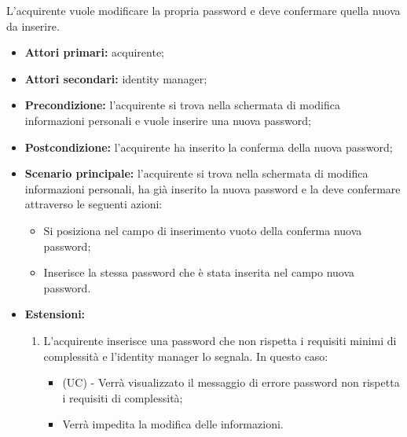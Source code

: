 L'acquirente vuole modificare la propria password e deve confermare quella nuova da inserire.
\begin{itemize}
    \item \textbf{Attori primari:} acquirente;
    \item \textbf{Attori secondari:} identity manager;
    \item \textbf{Precondizione:} l'acquirente si trova nella schermata di modifica informazioni personali e vuole inserire una nuova password;
    \item \textbf{Postcondizione:} l'acquirente ha inserito la conferma della nuova password;
    \item \textbf{Scenario principale:} l'acquirente si trova nella schermata di modifica informazioni personali, ha già inserito la nuova password e la deve confermare attraverso le seguenti azioni:
    \begin{itemize}
        \item Si posiziona nel campo di inserimento vuoto della conferma nuova password;
        \item Inserisce la stessa password che è stata inserita nel campo nuova password.
    \end{itemize}
    \item \textbf{Estensioni:}
    \begin{enumerate}[label=\lett]
        \item L'acquirente inserisce una password che non rispetta i requisiti minimi di complessità e l'identity manager lo segnala. In questo caso:
        \begin{itemize}
            \item (UC) - Verrà visualizzato il messaggio di errore password non rispetta i requisiti di complessità;
            \item Verrà impedita la modifica delle informazioni.
        \end{itemize}
    \end{enumerate}
\end{itemize}


